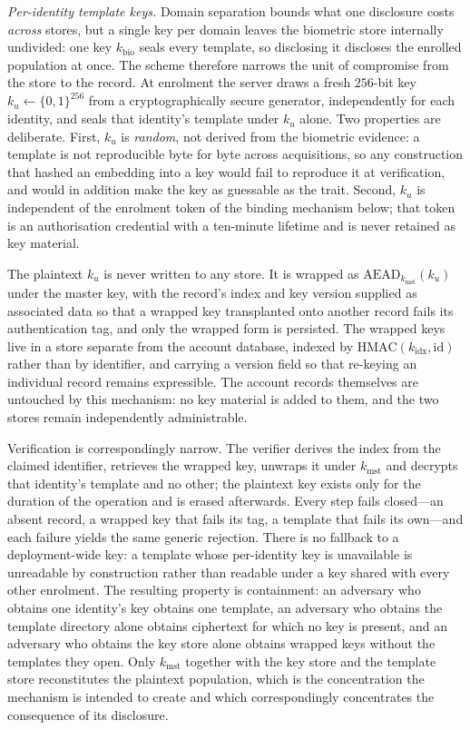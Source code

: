 \documentclass[10pt,journal,compsoc]{IEEEtran}
\begin{document}
{\textcolor{revpink}{\emph{Per-identity template keys.} Domain separation bounds what one disclosure costs \emph{across} stores, but a single key per domain leaves the biometric store internally undivided: one key $k_{\text{bio}}$ seals every template, so disclosing it discloses the enrolled population at once. The scheme therefore narrows the unit of compromise from the store to the record. At enrolment the server draws a fresh $256$-bit key $k_u \leftarrow \{0,1\}^{256}$ from a cryptographically secure generator, independently for each identity, and seals that identity's template under $k_u$ alone. Two properties are deliberate. First, $k_u$ is \emph{random}, not derived from the biometric evidence: a template is not reproducible byte for byte across acquisitions, so any construction that hashed an embedding into a key would fail to reproduce it at verification, and would in addition make the key as guessable as the trait. Second, $k_u$ is independent of the enrolment token of the binding mechanism below; that token is an authorisation credential with a ten-minute lifetime and is never retained as key material.}

\textcolor{revpink}{The plaintext $k_u$ is never written to any store. It is wrapped as $\mathrm{AEAD}_{k_{\text{mst}}}(k_u)$ under the master key, with the record's index and key version supplied as associated data so that a wrapped key transplanted onto another record fails its authentication tag, and only the wrapped form is persisted. The wrapped keys live in a store separate from the account database, indexed by $\mathrm{HMAC}(k_{\text{idx}},\text{id})$ rather than by identifier, and carrying a version field so that re-keying an individual record remains expressible. The account records themselves are untouched by this mechanism: no key material is added to them, and the two stores remain independently administrable.}

\textcolor{revpink}{Verification is correspondingly narrow. The verifier derives the index from the claimed identifier, retrieves the wrapped key, unwraps it under $k_{\text{mst}}$ and decrypts that identity's template and no other; the plaintext key exists only for the duration of the operation and is erased afterwards. Every step fails closed---an absent record, a wrapped key that fails its tag, a template that fails its own---and each failure yields the same generic rejection. There is no fallback to a deployment-wide key: a template whose per-identity key is unavailable is unreadable by construction rather than readable under a key shared with every other enrolment. The resulting property is containment: an adversary who obtains one identity's key obtains one template, an adversary who obtains the template directory alone obtains ciphertext for which no key is present, and an adversary who obtains the key store alone obtains wrapped keys without the templates they open. Only $k_{\text{mst}}$ together with the key store and the template store reconstitutes the plaintext population, which is the concentration the mechanism is intended to create and which correspondingly concentrates the consequence of its disclosure.}

}
\end{document}
